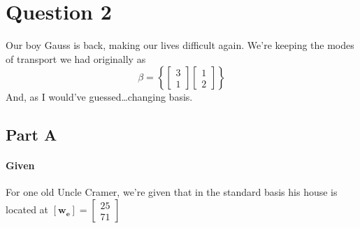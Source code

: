 \documentclass{article}
\begin{document}
    \section{Question 2}
        Our boy Gauss is back, making our lives difficult again. We're keeping the modes of
        transport we had originally as
        \[
            \beta
            =\left\{
                \begin{bmatrix}
                    3\\1
                \end{bmatrix}
                \begin{bmatrix}
                    1\\2
                \end{bmatrix}
            \right\}
        \]
        And, as I would've guessed\dots changing basis.
        \subsection{Part A}
            \paragraph{Given}
                For one old Uncle Cramer, we're given that in the standard basis
                his house is located at 
                $\left[\mathbf{w}_{\mathbf{e}}\right]=\begin{bmatrix}25\\71\end{bmatrix}$
\end{document}
